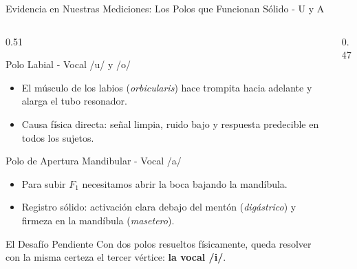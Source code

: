 \begin{frame}{Evidencia en Nuestras Mediciones: Los Polos que Funcionan Sólido - U y A}
    \begin{columns}[c]
        \begin{column}{0.51\textwidth}
            \scriptsize
            \begin{block}{Polo Labial - Vocal /u/ y /o/}
                \begin{itemize}\setlength{\itemsep}{1pt}\setlength{\parskip}{0pt}
                    \item El músculo de los labios (\textit{orbicularis}) hace trompita hacia adelante y alarga el tubo resonador.
                    \item Causa física directa: señal limpia, ruido bajo y respuesta predecible en todos los sujetos.
                \end{itemize}
            \end{block}
            \vspace{0.03cm}
            \begin{block}{Polo de Apertura Mandibular - Vocal /a/}
                \begin{itemize}\setlength{\itemsep}{1pt}\setlength{\parskip}{0pt}
                    \item Para subir $F_1$ necesitamos abrir la boca bajando la mandíbula.
                    \item Registro sólido: activación clara debajo del mentón (\textit{digástrico}) y firmeza en la mandíbula (\textit{masetero}).
                \end{itemize}
            \end{block}
            \vspace{0.03cm}
            \begin{alertblock}{El Desafío Pendiente}
                Con dos polos resueltos físicamente, queda resolver con la misma certeza el tercer vértice: \textbf{la vocal /i/}.
            \end{alertblock}
        \end{column}
        \begin{column}{0.47\textwidth}
            \centering
        \end{column}
    \end{columns}
\end{frame}
